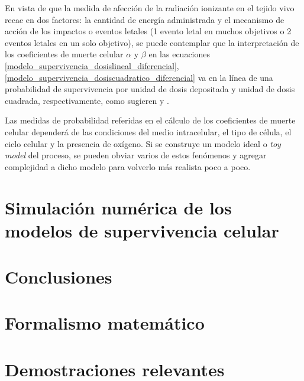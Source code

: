 \documentclass[12pt,letterpaper, oneside]{book}
\begin{document}
	En vista de que la medida de afección de la radiación ionizante en el tejido vivo recae en dos factores: la cantidad de energía administrada y el mecanismo de acción de los impactos o eventos letales (1 evento letal en muchos objetivos o 2 eventos letales en un solo objetivo), se puede contemplar que la interpretación de los coeficientes de muerte celular $\alpha$ y $\beta$ en las ecuaciones \ref{modelo_supervivencia_dosislineal_diferencial}, \ref{modelo_supervivencia_dosiscuadratico_diferencial} va en la línea de una probabilidad de supervivencia por unidad de dosis depositada y unidad de dosis cuadrada, respectivamente, como sugieren \cite{Tubiana.1990} y \cite{McMahon.2018}. 
	
	Las medidas de probabilidad referidas en el cálculo de los coeficientes de muerte celular dependerá de las condiciones del medio intracelular, el tipo de célula, el ciclo celular y la presencia de oxígeno. Si se construye un modelo ideal o \textit{toy model} del proceso, se pueden obviar varios de estos fenómenos y agregar complejidad a dicho modelo para volverlo más realista poco a poco. 
	

	\chapter{Simulación numérica de los modelos de supervivencia celular}
		
	\chapter{Conclusiones}
	
	\appendix
	\clearpage
	\addappheadtotoc
	\appendixpage
	
	\chapter{Formalismo matemático}
	
	\chapter{Demostraciones relevantes}

	
	
	
\end{document}
